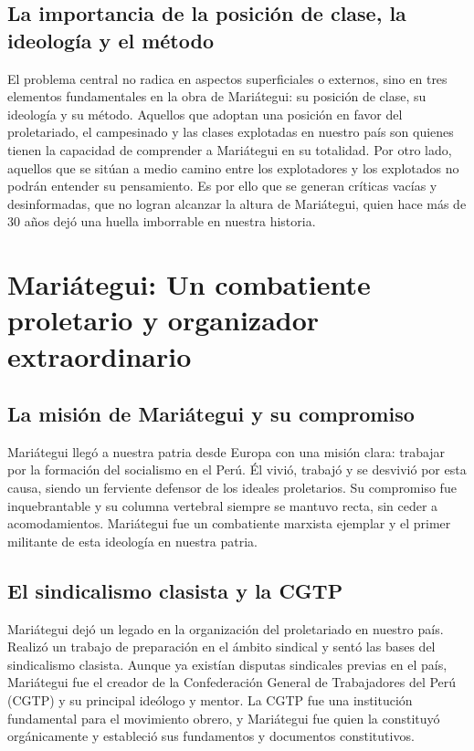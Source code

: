 \documentclass[
  jou,
  floatsintext,
  longtable,
  a4paper,
  nolmodern,
  notxfonts,
  notimes,
  12pt,
  colorlinks=true,linkcolor=blue,citecolor=blue,urlcolor=blue]{apa7}
\begin{document}
\subsection{La importancia de la posición de clase, la ideología y el
método}\label{la-importancia-de-la-posiciuxf3n-de-clase-la-ideologuxeda-y-el-muxe9todo}

El problema central no radica en aspectos superficiales o externos, sino
en tres elementos fundamentales en la obra de Mariátegui: su posición de
clase, su ideología y su método. Aquellos que adoptan una posición en
favor del proletariado, el campesinado y las clases explotadas en
nuestro país son quienes tienen la capacidad de comprender a Mariátegui
en su totalidad. Por otro lado, aquellos que se sitúan a medio camino
entre los explotadores y los explotados no podrán entender su
pensamiento. Es por ello que se generan críticas vacías y desinformadas,
que no logran alcanzar la altura de Mariátegui, quien hace más de 30
años dejó una huella imborrable en nuestra historia.

\section{Mariátegui: Un combatiente proletario y organizador
extraordinario}\label{mariuxe1tegui-un-combatiente-proletario-y-organizador-extraordinario}

\subsection{La misión de Mariátegui y su
compromiso}\label{la-misiuxf3n-de-mariuxe1tegui-y-su-compromiso}

Mariátegui llegó a nuestra patria desde Europa con una misión clara:
trabajar por la formación del socialismo en el Perú. Él vivió, trabajó y
se desvivió por esta causa, siendo un ferviente defensor de los ideales
proletarios. Su compromiso fue inquebrantable y su columna vertebral
siempre se mantuvo recta, sin ceder a acomodamientos. Mariátegui fue un
combatiente marxista ejemplar y el primer militante de esta ideología en
nuestra patria.

\subsection{El sindicalismo clasista y la
CGTP}\label{el-sindicalismo-clasista-y-la-cgtp}

Mariátegui dejó un legado en la organización del proletariado en nuestro
país. Realizó un trabajo de preparación en el ámbito sindical y sentó
las bases del sindicalismo clasista. Aunque ya existían disputas
sindicales previas en el país, Mariátegui fue el creador de la
Confederación General de Trabajadores del Perú (CGTP) y su principal
ideólogo y mentor. La CGTP fue una institución fundamental para el
movimiento obrero, y Mariátegui fue quien la constituyó orgánicamente y
estableció sus fundamentos y documentos constitutivos.
\end{document}
